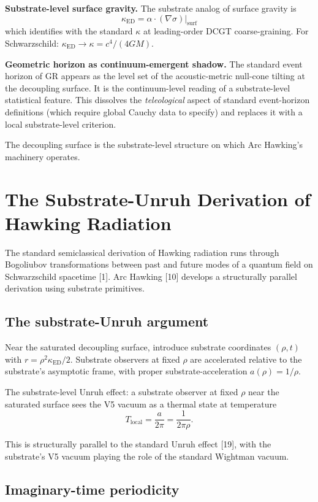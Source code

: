 \documentclass[11pt,a4paper]{article}
\begin{document}
\textbf{Substrate-level surface gravity.} The substrate analog of surface gravity is
\[
\kappa_{\mathrm{ED}} = \alpha \cdot (\nabla\sigma)|_{\mathrm{surf}}
\]
which identifies with the standard $\kappa$ at leading-order DCGT coarse-graining. For Schwarzschild: $\kappa_{\mathrm{ED}} \to \kappa = c^4/(4 G M)$.

\textbf{Geometric horizon as continuum-emergent shadow.} The standard event horizon of GR appears as the level set of the acoustic-metric null-cone tilting at the decoupling surface. It is the continuum-level reading of a substrate-level statistical feature. This dissolves the \emph{teleological} aspect of standard event-horizon definitions (which require global Cauchy data to specify) and replaces it with a local substrate-level criterion.

The decoupling surface is the substrate-level structure on which Arc Hawking's machinery operates.

\section{The Substrate-Unruh Derivation of Hawking Radiation}

The standard semiclassical derivation of Hawking radiation runs through Bogoliubov transformations between past and future modes of a quantum field on Schwarzschild spacetime [1]. Arc Hawking [10] develops a structurally parallel derivation using substrate primitives.

\subsection{The substrate-Unruh argument}

Near the saturated decoupling surface, introduce substrate coordinates $(\rho, t)$ with $r = \rho^2 \kappa_{\mathrm{ED}} / 2$. Substrate observers at fixed $\rho$ are accelerated relative to the substrate's asymptotic frame, with proper substrate-acceleration $a(\rho) = 1/\rho$.

The substrate-level Unruh effect: a substrate observer at fixed $\rho$ near the saturated surface sees the V5 vacuum as a thermal state at temperature
\[
T_{\mathrm{local}} = \frac{a}{2\pi} = \frac{1}{2\pi\rho}.
\]

This is structurally parallel to the standard Unruh effect [19], with the substrate's V5 vacuum playing the role of the standard Wightman vacuum.

\subsection{Imaginary-time periodicity}
\end{document}
